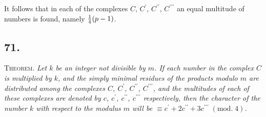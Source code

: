 \documentclass[twoside,12pt]{memoir}
\renewcommand{\pmod}[1]{\;(\textrm{mod.}\;#1)}
\let\oldfrac\frac
\def\frac#1#2{\mathchoice{\tfrac{#1}{#2}}{\oldfrac{#1}{#2}}{\genfrac{}{}{}{2}{#1}{#2\mathstrut}}{\genfrac{}{}{}{3}{#1}{#2\mathstrut}}}
\begin{document}
It follows that in each of the complexes \(C\), \(C^{\prime}\), \(C^{\prime \prime}\), \(C^{\prime \prime \prime}\) an equal multitude of numbers is found, namely \(\frac{1}{4}(p-1)\).

\subsection*{71.}
 
\textsc{Theorem.} \textit{Let \(k\) be an integer not divisible by \(m\).  If each number in the complex \(C\) is multiplied by \(k\), and the simply minimal residues of the products \pagebreak%
modulo \(m\) are distributed among the complexes \(C\), \(C^{\prime}\), \(C^{\prime \prime}\), \(C^{\prime \prime \prime}\), and the multitudes of each of these complexes are denoted by \(c\), \(c^{\prime}\), \(c^{\prime \prime}\), \(c^{\prime \prime \prime}\) respectively, then the character of the number \(k\) with respect to the modulus \(m\) will be \(\equiv c^{\prime}+2 c^{\prime \prime}+3 c^{\prime \prime \prime}\pmod{4}\).}
\end{document}
